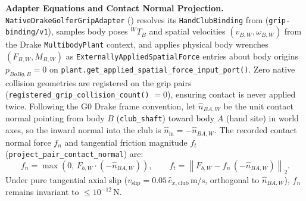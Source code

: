 \documentclass[11pt,a4paper]{article}
\begin{document}
\textbf{Adapter Equations and Contact Normal Projection.}
\texttt{NativeDrakeGolferGripAdapter} () resolves its \texttt{HandClubBinding} from  (\texttt{grip-binding/v1}), samples body poses ${}^{W}T_{B}$ and spatial velocities $(v_{B,W}, \omega_{B,W})$ from the Drake \texttt{MultibodyPlant} context, and applies physical body wrenches $(F_{B,W}, M_{B,W})$ as \texttt{ExternallyAppliedSpatialForce} entries about body origins $p_{BoBq,B} = 0$ on \texttt{plant.get\_applied\_spatial\_force\_input\_port()}. Zero native collision geometries are registered on the grip pairs (\texttt{registered\_grip\_collision\_count()} $= 0$), ensuring contact is never applied twice.
Following the G0 Drake frame convention, let $\hat{n}_{BA,W}$ be the unit contact normal pointing from body $B$ (\texttt{club\_shaft}) toward body $A$ (hand site) in world axes, so the inward normal into the club is $\hat{n}_{\mathrm{in}} = -\hat{n}_{BA,W}$. The recorded contact normal force $f_n$ and tangential friction magnitude $f_t$ (\texttt{project\_pair\_contact\_normal}) are:
\begin{equation}
f_n = \max\!\left(0,\, F_{b,W} \cdot (-\hat{n}_{BA,W})\right), \qquad
f_t = \left\| F_{b,W} - f_n\,(-\hat{n}_{BA,W}) \right\|_2.
\end{equation}
Under pure tangential axial slip ($v_{\mathrm{slip}} = 0.05\,\hat{e}_{x,\mathrm{club}}\,\mathrm{m/s}$, orthogonal to $\hat{n}_{BA,W}$), $f_n$ remains invariant to $\le 10^{-12}\,\mathrm{N}$.
\end{document}

